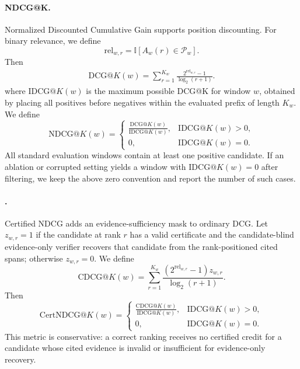 \documentclass{article}
\begin{document}
\paragraph{NDCG@K.}
Normalized Discounted Cumulative Gain supports position discounting.
For binary relevance, we define
\[
\mathrm{rel}_{w,r}=\mathbb{I}[A_w(r)\in\mathcal{P}_w].
\]
Then
\begin{equation}
\begin{aligned}
\mathrm{DCG}@K(w)=
\sum_{r=1}^{K_w}
\frac{2^{\mathrm{rel}_{w,r}}-1}{\log_2(r+1)}.
\end{aligned}
\end{equation}
where $\mathrm{IDCG}@K(w)$ is the maximum possible DCG@K for window $w$, obtained by placing all positives before negatives within the evaluated prefix of length $K_w$.
We define
\begin{equation}
\mathrm{NDCG}@K(w)=
\begin{cases}
\frac{\mathrm{DCG}@K(w)}{\mathrm{IDCG}@K(w)},
& \mathrm{IDCG}@K(w)>0,\\[6pt]
0,
& \mathrm{IDCG}@K(w)=0.
\end{cases}
\end{equation}
All standard evaluation windows contain at least one positive candidate.
If an ablation or corrupted setting yields a window with $\mathrm{IDCG}@K(w)=0$ after filtering, we keep the above zero convention and report the number of such cases.

\paragraph{\CertNDCG@K.}
Certified NDCG adds an evidence-sufficiency mask to ordinary DCG. Let $z_{w,r}=1$ if the candidate at rank $r$ has a valid certificate and the candidate-blind evidence-only verifier recovers that candidate from the rank-positioned cited spans; otherwise $z_{w,r}=0$. We define
\begin{equation}
\mathrm{CDCG}@K(w)=
\sum_{r=1}^{K_w}
\frac{(2^{\mathrm{rel}_{w,r}}-1)z_{w,r}}{\log_2(r+1)}.
\end{equation}
Then
\begin{equation}
\mathrm{CertNDCG}@K(w)=
\begin{cases}
\frac{\mathrm{CDCG}@K(w)}{\mathrm{IDCG}@K(w)},
& \mathrm{IDCG}@K(w)>0,\\[6pt]
0,
& \mathrm{IDCG}@K(w)=0.
\end{cases}
\end{equation}
This metric is conservative: a correct ranking receives no certified credit for a candidate whose cited evidence is invalid or insufficient for evidence-only recovery.
\end{document}
